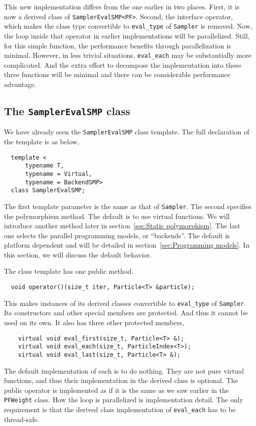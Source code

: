This new implementation differs from the one earlier in two places. First, it
is now a derived class of \verb|SamplerEvalSMP<PF>|. Second, the interface
operator, which makes the class type convertible to \verb|eval_type| of
\verb|Sampler| is removed. Now, the loop inside that operator in earlier
implementations will be parallelized. Still, for this simple function, the
performance benefits through parallelization is minimal. However, in less
trivial situations, \verb|eval_each| may be substantially more complicated. And
the extra effort to decompose the implementation into these three functions
will be minimal and there can be considerable performance advantage.

\subsection{The \texorpdfstring{\texttt{SamplerEvalSMP}}{SamplerEvalSMP} class}
\label{sub:The SamplerEvalSMP class}

We have already seen the \verb|SamplerEvalSMP| class template. The full
declaration of the template is as below,
\begin{Verbatim}
  template <
      typename T,
      typename = Virtual,
      typename = BackendSMP>
  class SamplerEvalSMP;
\end{Verbatim}
The first template parameter is the same as that of \verb|Sampler|. The second
specifies the polymorphism method. The default is to use virtual functions. We
will introduce another method later in section~\ref{sec:Static polymorphism}.
The last one selects the parallel programming models, or ``backends''. The
default is platform dependent and will be detailed in
section~\ref{sec:Programming models}. In this section, we will discuss the
default behavior.

The class template has one public method.
\begin{Verbatim}
  void operator()(size_t iter, Particle<T> &particle);
\end{Verbatim}
This makes instances of its derived classes convertible to \verb|eval_type| of
\verb|Sampler|. Its constructors and other special members are protected. And
thus it cannot be used on its own. It also has three other protected members,
\begin{Verbatim}
    virtual void eval_first(size_t, Particle<T> &);
    virtual void eval_each(size_t, ParticleIndex<T>);
    virtual void eval_last(size_t, Particle<T> &);
\end{Verbatim}
The default implementation of each is to do nothing. They are not pure virtual
functions, and thus their implementation in the derived class is optional. The
public operator is implemented as if it is the same as we saw earlier in the
\verb|PFWeight| class. How the loop is parallelized is implementation detail.
The only requirement is that the derived class implementation of
\verb|eval_each| has to be thread-safe.

